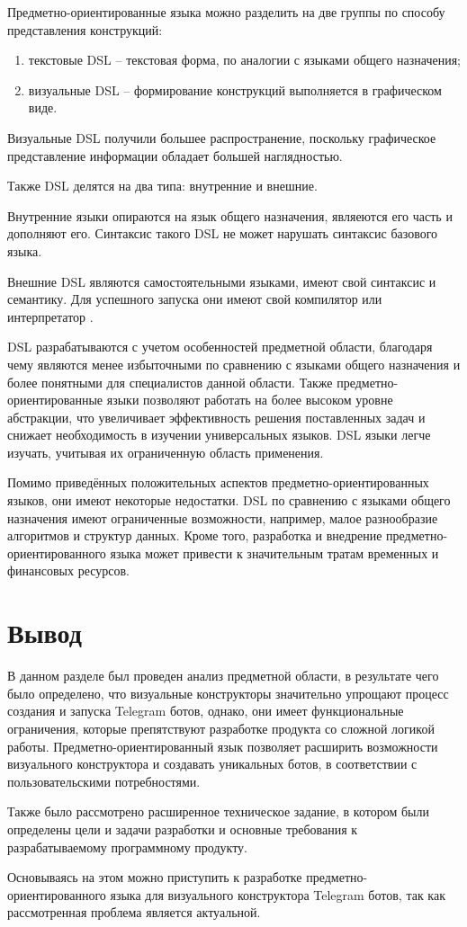 Предметно-ориентированные языка можно разделить на две группы по способу представления конструкций:
\begin{enumerate}
    \item текстовые DSL -- текстовая форма, по аналогии с языками общего назначения;
    \item визуальные DSL -- формирование конструкций выполняется в графическом виде.
\end{enumerate}

Визуальные DSL получили большее распространение, поскольку графическое представление информации обладает большей наглядностью.

Также DSL делятся на два типа: внутренние и внешние.

Внутренние языки опираются на язык общего назначения, являеются его часть и дополняют его.
Синтаксис такого DSL не может нарушать синтаксис базового языка.

Внешние DSL являются самостоятельными языками, имеют свой синтаксис и семантику.
Для успешного запуска они имеют свой компилятор или интерпретатор .

DSL разрабатываются с учетом особенностей предметной области,
благодаря чему являются менее избыточными по сравнению с языками общего назначения и более понятными для специалистов данной области.
Также предметно-ориентированные языки позволяют работать на более высоком уровне абстракции,
что увеличивает эффективность решения поставленных задач и снижает необходимость в изучении универсальных языков.
DSL языки легче изучать, учитывая их ограниченную область применения.

Помимо приведённых положительных аспектов предметно-ориентированных языков, они имеют некоторые недостатки.
DSL по сравнению с языками общего назначения имеют ограниченные возможности, например, малое разнообразие алгоритмов и структур данных.
Кроме того, разработка и внедрение предметно-ориентированного языка может привести к значительным тратам временных и финансовых ресурсов.



\section*{Вывод}

В данном разделе был проведен анализ предметной области, в результате чего было определено,
что визуальные конструкторы значительно упрощают процесс создания и запуска Telegram ботов,
однако, они имеет функциональные ограничения, которые препятствуют разработке продукта со сложной логикой работы.
Предметно-ориентированный язык позволяет расширить возможности визуального конструктора и создавать уникальных ботов,
в соответствии с пользовательскими потребностями.

Также было рассмотрено расширенное техническое задание,
в котором были определены цели и задачи разработки и основные требования к разрабатываемому программному продукту.

Основываясь на этом можно приступить к разработке предметно-ориентированного языка для визуального конструктора Telegram ботов,
так как рассмотренная проблема является актуальной.